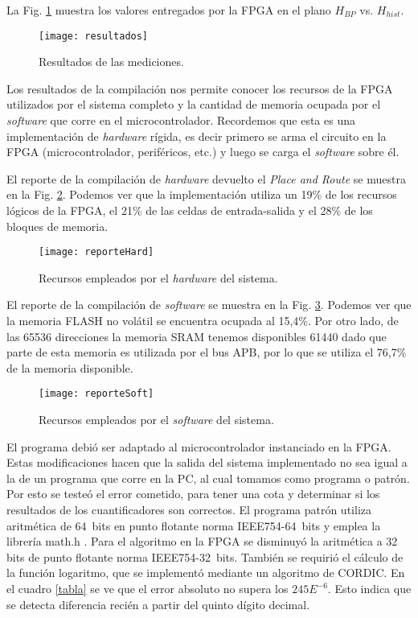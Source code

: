 La Fig. \ref{fig:resultados} muestra los valores entregados por la FPGA en el plano $H_{BP}$ vs. $H_{hist}$.
%
\begin{figure}[htb]
	\centering\texttt{[image: resultados]}
	\caption{Resultados de las mediciones.}\label{fig:resultados}
\end{figure}

Los resultados de la compilación nos permite conocer los recursos de la FPGA utilizados por el sistema completo y la cantidad de memoria ocupada por el \textit{software} que corre en el microcontrolador.
Recordemos que esta es una implementación de \textit{hardware} rígida, es decir primero se arma el circuito en la FPGA (microcontrolador, periféricos, etc.) y luego se carga el \textit{software} sobre él.

El reporte de la compilación de \textit{hardware} devuelto el \textit{Place and Route} se muestra en la Fig. \ref{fig:hard}. Podemos ver que la implementación utiliza un 19\% de los recursos lógicos de la FPGA, el 21\% de las celdas de entrada-salida y el 28\% de los bloques de memoria.
%
\begin{figure}[htb]
	\centering\texttt{[image: reporteHard]}
	\caption{Recursos empleados por el \textit{hardware} del sistema.}\label{fig:hard}
\end{figure}

El reporte de la compilación de \textit{software} se muestra en la Fig. \ref{fig:soft}.
Podemos ver que la memoria FLASH no volátil se encuentra ocupada al 15,4\%.
Por otro lado, de las 65536 direcciones la memoria SRAM tenemos disponibles 61440 dado que parte de esta memoria es utilizada por el bus APB, por lo que se utiliza el 76,7\% de la memoria disponible.
%
\begin{figure}[htb]
	\centering\texttt{[image: reporteSoft]}
	\caption{Recursos empleados por el \textit{software} del sistema.}\label{fig:soft}
\end{figure}

El programa debió ser adaptado al microcontrolador instanciado en la FPGA.
Estas modificaciones hacen que la salida del sistema implementado no sea igual a la de un programa que corre en la PC, al cual tomamos como programa o patrón.
Por esto se testeó el error cometido, para tener una cota y determinar si los resultados de los cuantificadores son correctos.
El programa patrón utiliza aritmética de 64~bits en punto flotante norma IEEE754-64~bits y emplea la librería math.h \cite{Mathe}.
Para el algoritmo en la FPGA se disminuyó la aritmética a 32 bits de punto flotante norma IEEE754-32~bits.
También se requirió el cálculo de la función logaritmo, que se implementó mediante un algoritmo de CORDIC.
En el cuadro \ref{tabla} se ve que el error absoluto no supera los $245E^{-6}$. Esto indica que se detecta diferencia recién a partir del quinto dígito decimal.

